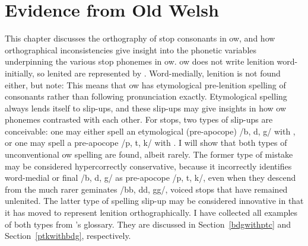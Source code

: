 \chapter{Evidence from Old Welsh}
\label{oldwelsh}
This chapter discusses the orthography of stop consonants in \gls{ow}, and how orthographical inconsistencies give insight into the phonetic variables underpinning the various stop phonemes in \gls{ow}.  \Gls{ow} does not write lenition word-initially, so lenited  are represented by . Word-medially, lenition is not found either, but note: 
This means that \gls{ow} has etymological pre-lenition spelling of consonants rather than following pronunciation exactly. Etymological spelling always lends itself to slip-ups, and these slip-ups may give insights in how \gls{ow} phonemes contrasted with each other. For stops, two types of slip-ups are conceivable: one may either spell an etymological (pre-apocope) /b, d, g/ with , or one may spell a pre-apocope /p, t, k/ with . I will show that both types of unconventional \gls{ow} spelling are found, albeit rarely. The former type of mistake may be considered hypercorrectly conservative, because it incorrectly identifies word-medial or final /b, d, g/ as pre-apocope /p, t, k/, even when they descend from the much rarer geminates /bb, dd, gg/, \ie voiced stops that have remained unlenited. The latter type of spelling slip-up may be considered innovative in that it has moved to represent lenition orthographically. I have collected all examples of both types from \textcite{falileyev_etymological_2000}'s glossary. They are discussed in Section~\ref{bdgwithptc} and Section~\ref{ptkwithbdg}, respectively.





